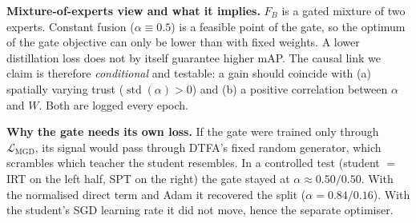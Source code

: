 \documentclass[8pt,a4paper]{article}
\begin{document}
\textbf{Mixture-of-experts view and what it implies.} $F_B$ is a gated mixture of two experts. Constant fusion ($\alpha\equiv0.5$) is a feasible point of the gate, so the optimum of the gate objective can only be lower than with fixed weights. A lower distillation loss does not by itself guarantee higher mAP. The causal link we claim is therefore \emph{conditional} and testable: a gain should coincide with (a) spatially varying trust ($\operatorname{std}(\alpha)>0$) and (b) a positive correlation between $\alpha$ and $W$. Both are logged every epoch.

\textbf{Why the gate needs its own loss.} If the gate were trained only through $\mathcal{L}_{\mathrm{MGD}}$, its signal would pass through DTFA's fixed random generator, which scrambles which teacher the student resembles. In a controlled test (student $=$ IRT on the left half, SPT on the right) the gate stayed at $\alpha\approx0.50/0.50$. With the normalised direct term and Adam it recovered the split ($\alpha=0.84/0.16$). With the student's SGD learning rate it did not move, hence the separate optimiser.

\end{document}
